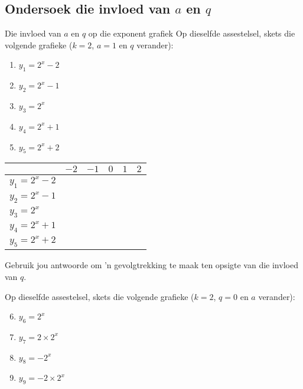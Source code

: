 \subsection*{Ondersoek die invloed van $a$ en $q$}
\begin{Investigation}{Die invloed van $a$ en $q$ op die exponent grafiek}
Op dieselfde assestelsel, skets die volgende grafieke ($k=2$, $a=1$ en $q$ verander):
\begin{enumerate}[noitemsep, label=\textbf{\arabic*}. ] 
\item $y_1=2^{x}-2$
\item $y_2=2^{x}-1$
\item $y_3=2^{x}$
\item $y_4=2^{x}+1$
\item $y_5=2^{x}+2$
\end{enumerate}

\begin{table}[H]
\begin{center}
\begin{tabular}{|l|c|c|c|c|c|}
\hline
   &  $-2$ & $-1$ & $0$ & $1$ & $2$ 
\\ \hline
$y_1=2^{x}-2$& \hspace{1cm} & \hspace{1cm} & \hspace{1cm} & \hspace{1cm} & \hspace{1cm}
\\ \hline
 $y_2=2^{x}-1$&  &&&&
\\ \hline
$y_3=2^{x}$&  &&&&
\\ \hline
$y_4=2^{x}+1$&  &&&&
\\ \hline
$y_5=2^{x}+2$&  &&&&
\\ \hline
\end{tabular}
\end{center}
\end{table}
Gebruik jou antwoorde om ’n gevolgtrekking te maak ten opsigte van die invloed van $q$.
\\
\par
Op dieselfde assestelsel, skets die volgende grafieke ($k=2$, $q=0$ en $a$ verander):
\begin{enumerate}[noitemsep, label=\textbf{\arabic*}. ] 
\setcounter{enumi}{5}
\item $y_6=2^{x}$
\item $y_7=2 \times 2^{x}$
\item $y_8=-2^{x}$
\item $y_9=-2 \times 2^{x}$
\end{enumerate}


\end{Investigation}

